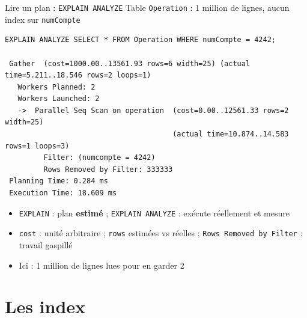 \documentclass[aspectratio=169,10pt]{beamer}
\begin{document}
\begin{frame}[fragile]{Lire un plan : \texttt{EXPLAIN ANALYZE}}
  Table \texttt{Operation} : 1 million de lignes, aucun index sur \texttt{numCompte}
\begin{lstlisting}[style=plan]
EXPLAIN ANALYZE SELECT * FROM Operation WHERE numCompte = 4242;

 Gather  (cost=1000.00..13561.93 rows=6 width=25) (actual time=5.211..18.546 rows=2 loops=1)
   Workers Planned: 2
   Workers Launched: 2
   ->  Parallel Seq Scan on operation  (cost=0.00..12561.33 rows=2 width=25)
                                       (actual time=10.874..14.583 rows=1 loops=3)
         Filter: (numcompte = 4242)
         Rows Removed by Filter: 333333
 Planning Time: 0.284 ms
 Execution Time: 18.609 ms
\end{lstlisting}
  \begin{itemize}
    \item \texttt{EXPLAIN} : plan \textbf{estim\'e} ; \texttt{EXPLAIN ANALYZE} : ex\'ecute r\'eellement et mesure
    \item \texttt{cost} : unit\'e arbitraire ; \texttt{rows} estim\'ees vs r\'eelles ; \texttt{Rows Removed by Filter} : travail gaspill\'e
    \item Ici : \alert{1 million de lignes lues pour en garder 2}
  \end{itemize}
\end{frame}

\section{Les index}
\end{document}
